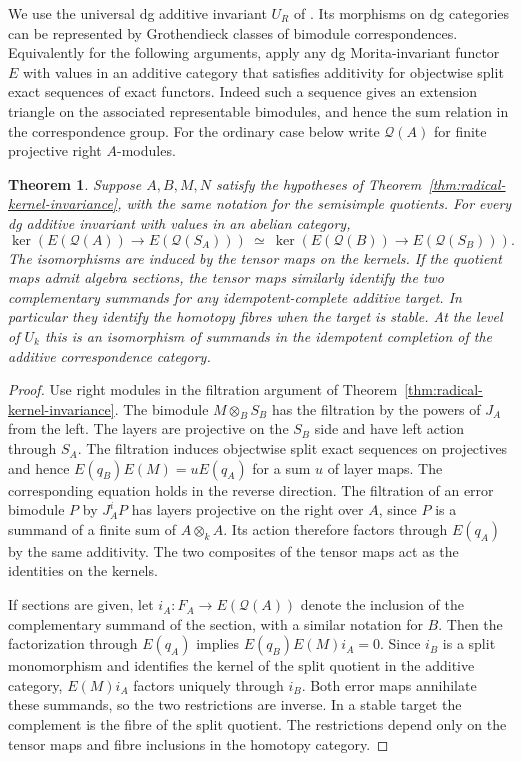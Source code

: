 \documentclass[12pt,a4paper,english,reqno]{amsart}
\numberwithin{equation}{section}
\theoremstyle{plain}
\newtheorem{theorem}{Theorem}[section]
\theoremstyle{definition}
\begin{document}
We use the universal dg additive invariant $U_R$ of
\cite[Section~2]{TabuadaGaloisAdditive}. Its morphisms on
dg categories can be represented by Grothendieck classes
of bimodule correspondences. Equivalently for the following
arguments, apply any dg Morita-invariant functor $E$ with
values in an additive category that satisfies additivity
for objectwise split exact sequences of exact functors.
Indeed such a sequence gives an extension triangle on the
associated representable bimodules, and hence the sum
relation in the correspondence group. For the ordinary
case below write $\mathcal Q(A)$ for finite projective right
$A$-modules.

\begin{theorem}\label{thm:radical-additive}
Suppose $A,B,M,N$ satisfy the hypotheses of
Theorem~\ref{thm:radical-kernel-invariance}, with the same
notation for the semisimple quotients. For every dg additive
invariant with values in an abelian category,
\[
 \ker(E(\mathcal Q(A))\to E(\mathcal Q(S_A)))
 \ \simeq\
 \ker(E(\mathcal Q(B))\to E(\mathcal Q(S_B))).
\]
The isomorphisms are induced by the tensor maps on the
kernels. If the quotient maps admit algebra sections, the
tensor maps similarly identify the two complementary
summands for any idempotent-complete additive target.
In particular they identify the homotopy fibres when the
target is stable. At the level of $U_k$ this is an
isomorphism of summands in the idempotent completion of the
additive correspondence category.
\end{theorem}

\begin{proof}
Use right modules in the filtration argument of
Theorem~\ref{thm:radical-kernel-invariance}. The bimodule
$M\otimes_B S_B$ has the filtration by the powers of $J_A$
from the left. The layers are projective on the $S_B$
side and have left action through $S_A$. The filtration
induces objectwise split exact sequences on projectives
and hence $E(q_B)E(M)=uE(q_A)$ for a sum $u$ of layer
maps. The corresponding equation holds in the reverse
direction. The filtration of an error bimodule $P$ by
$J_A^iP$ has layers projective on the right over $A$,
since $P$ is a summand of a finite sum of $A\otimes_k A$.
Its action therefore factors through $E(q_A)$ by the same
additivity. The two composites of the tensor maps act
as the identities on the kernels.

If sections are given, let $i_A:F_A\to E(\mathcal Q(A))$
denote the inclusion of the complementary summand of the
section, with a similar notation for $B$. Then the factorization
through $E(q_A)$ implies $E(q_B)E(M)i_A=0$. Since $i_B$
is a split monomorphism and identifies the kernel of the
split quotient in the additive category, $E(M)i_A$ factors
uniquely through $i_B$. Both error maps annihilate these
summands, so the two restrictions are inverse. In a stable
target the complement is the fibre of the split quotient.
The restrictions depend only on the tensor maps and fibre
inclusions in the homotopy category.
\end{proof}
\end{document}
